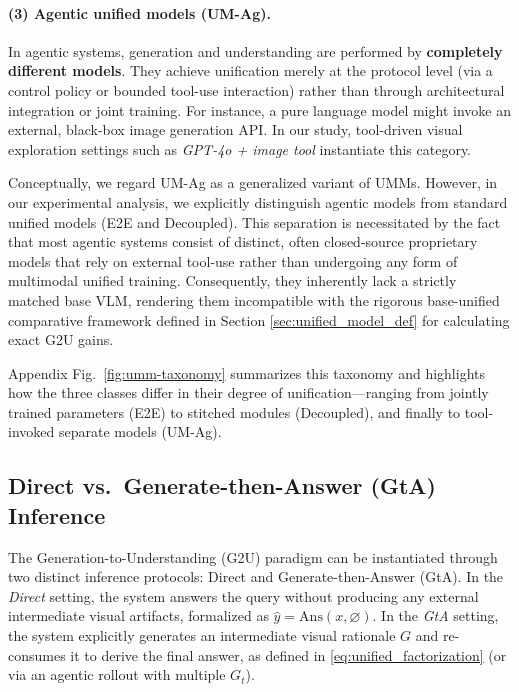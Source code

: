 \documentclass{article}
\theoremstyle{plain}
\theoremstyle{definition}
\theoremstyle{remark}
\begin{document}
\paragraph{(3) Agentic unified models (UM-Ag).}
In agentic systems, generation and understanding are performed by \textbf{completely different models}. They achieve unification merely at the protocol level (via a control policy or bounded tool-use interaction) rather than through architectural integration or joint training. For instance, a pure language model might invoke an external, black-box image generation API. In our study, tool-driven visual exploration settings such as \emph{GPT-4o + image tool} instantiate this category.

Conceptually, we regard UM-Ag as a generalized variant of UMMs. However, in our experimental analysis, we explicitly distinguish agentic models from standard unified models (E2E and Decoupled). This separation is necessitated by the fact that most agentic systems consist of distinct, often closed-source proprietary models that rely on external tool-use rather than undergoing any form of multimodal unified training. Consequently, they inherently lack a strictly matched base VLM, rendering them incompatible with the rigorous base-unified comparative framework defined in Section \ref{sec:unified_model_def} for calculating exact G2U gains.

Appendix Fig.~\ref{fig:umm-taxonomy} summarizes this taxonomy and highlights how the three classes differ in their degree of unification—ranging from jointly trained parameters (E2E) to stitched modules (Decoupled), and finally to tool-invoked separate models (UM-Ag).

\subsection{Direct vs.\ Generate-then-Answer (GtA) Inference}
\label{sec:direct_vs_gta}

The Generation-to-Understanding (G2U) paradigm can be instantiated through two distinct inference protocols: Direct and Generate-then-Answer (GtA).
In the \emph{Direct} setting, the system answers the query without producing any external intermediate visual artifacts, formalized as $\hat{y}=\mathrm{Ans}(x,\varnothing)$.
In the \emph{GtA} setting, the system explicitly generates an intermediate visual rationale $G$ and re-consumes it to derive the final answer, as defined in \eqref{eq:unified_factorization} (or via an agentic rollout with multiple $G_t$).
\end{document}
